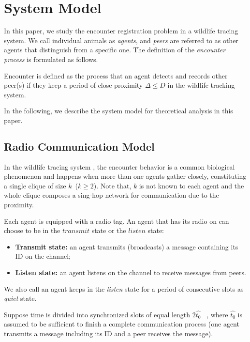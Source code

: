 \section{System Model}
\label{sectionmodel}

In this paper, we study the encounter registration problem in a wildlife 
tracing system. We call individual animals as \emph{agents}, 
and \emph{peers} are referred to as other agents that distinguish from 
a specific one.
The definition of the \emph{encounter process} is formulated as follows.
\begin{definition}
Encounter is defined as the process that 
an agent detects and records other peer(s) if they keep a period of 
close proximity $\Delta \leq D$
in the wildlife tracking system. 
\end{definition}

In the following, we describe the system model for theoretical analysis in this paper.



\subsection{Radio Communication Model}


In the  wildlife tracing system {\sysname}, the encounter behavior  
is a common biological phenomenon and
happens when more than one agents gather closely, constituting a 
single clique of size $k$~($k \geq 2$).
Note that, $k$ is not known to each agent and the whole 
clique composes a sing-hop network for communication due to the proximity. 

Each agent is equipped with a radio tag. 
An agent that has its radio on can choose to be in the $transmit$ state
or the $listen$ state:
\begin{itemize}
\item \textbf{Transmit state:} an agent transmits (broadcasts) 
a message containing its ID on the channel;
\item  \textbf{Listen state:} an agent listens on 
the channel to receive messages from peers.
\end{itemize}
We also call an agent keeps in the \emph{listen} state for a period of consecutive slots 
as \emph{quiet} state.

Suppose time is divided into synchronized slots of equal 
length $2\hat{t_0}$~\cite{Xu2005Lightweight, Sivrikaya2004Time}
, where $\hat{t_0}$ is assumed to be sufficient to finish a complete
communication process (one agent transmits a message including its ID and
a peer receives the message).

